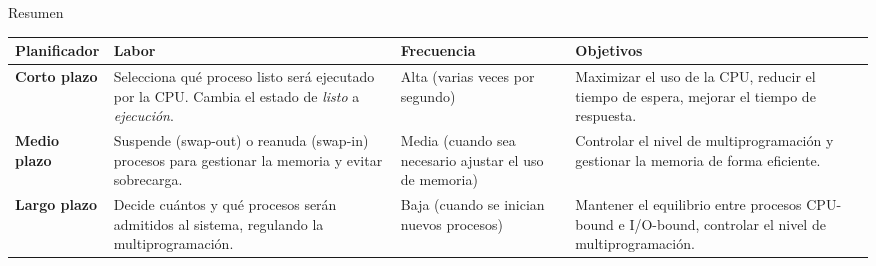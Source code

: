 \documentclass{beamer}
\begin{document}
 \begin{frame}{Resumen}
    \scriptsize
    \begin{longtable}{| p{1.5cm} | p{2.5cm} | p{1.5cm} | p{3cm} |}
        \hline
        \textbf{Planificador} & \textbf{Labor} & \textbf{Frecuencia} & \textbf{Objetivos} \\ \hline
        \textbf{Corto plazo} & Selecciona qué proceso listo será ejecutado por la CPU. Cambia el estado de \textit{listo} a \textit{ejecución}. & Alta (varias veces por segundo) & Maximizar el uso de la CPU, reducir el tiempo de espera, mejorar el tiempo de respuesta. \\ \hline
        \textbf{Medio plazo} & Suspende (swap-out) o reanuda (swap-in) procesos para gestionar la memoria y evitar sobrecarga. & Media (cuando sea necesario ajustar el uso de memoria) & Controlar el nivel de multiprogramación y gestionar la memoria de forma eficiente. \\ \hline
        \textbf{Largo plazo} & Decide cuántos y qué procesos serán admitidos al sistema, regulando la multiprogramación. & Baja (cuando se inician nuevos procesos) & Mantener el equilibrio entre procesos CPU-bound e I/O-bound, controlar el nivel de multiprogramación. \\ \hline
        \end{longtable}
    
\end{frame}
\end{document}
